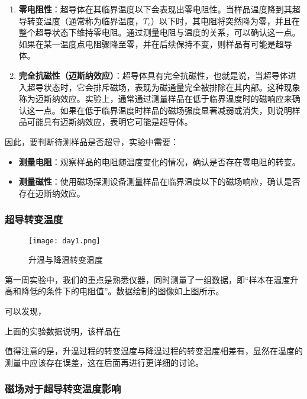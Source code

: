\begin{enumerate}
    \item \textbf{零电阻性}：超导体在其临界温度以下会表现出零电阻性。当样品温度降到其超导转变温度（通常称为临界温度，$T_c$）以下时，其电阻将突然降为零，并且在整个超导状态下维持零电阻。通过测量电阻与温度的关系，可以确认这一点。如果在某一温度点电阻骤降至零，并在后续保持不变，则样品有可能是超导体。
    
    \item \textbf{完全抗磁性（迈斯纳效应）}：超导体具有完全抗磁性，也就是说，当超导体进入超导状态时，它会排斥磁场，表现为磁通量完全被排除在其内部。这种现象称为迈斯纳效应。实验上，通常通过测量样品在低于临界温度时的磁响应来确认这一点。如果在低于临界温度时样品的磁场强度显著减弱或消失，则说明样品可能具有迈斯纳效应，表明它可能是超导体。
\end{enumerate}

因此，要判断待测样品是否超导，实验中需要：
\begin{itemize}
    \item \textbf{测量电阻}：观察样品的电阻随温度变化的情况，确认是否存在零电阻的转变。
    \item \textbf{测量磁性}：使用磁场探测设备测量样品在临界温度以下的磁场响应，确认是否存在迈斯纳效应。
\end{itemize}

\subsubsection{超导转变温度}
\begin{figure}[H]
	\centering
	\texttt{[image: day1.png]}
	\caption{升温与降温转变温度}
	\label{fig:day1}
\end{figure}

第一周实验中，我们的重点是熟悉仪器，同时测量了一组数据，即“样本在温度升高和降低的条件下的电阻值”。数据绘制的图像如上图所示。

可以发现，

上面的实验数据说明，该样品在

值得注意的是，升温过程的转变温度与降温过程的转变温度相差有，显然在温度的测量中应该存在误差，这在后面再进行更详细的讨论。

\subsubsection{磁场对于超导转变温度影响}

